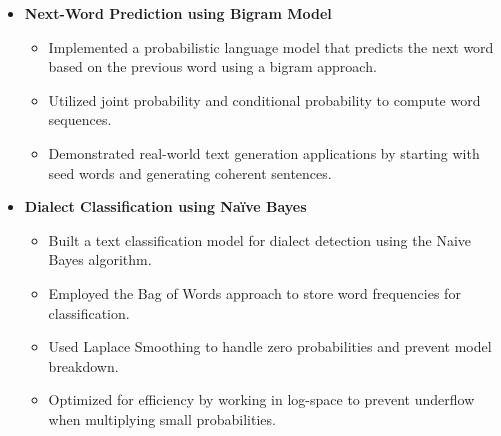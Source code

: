 \documentclass[letterpaper,11pt]{article}
\newcommand{\resitem}[1]{\item #1 \vspace{-2pt}}
\begin{document}
\begin{itemize}
\item[]
	\textbf{Next-Word Prediction using Bigram Model}
	\vspace{-3mm}
	\begin{itemize}
	    \resitem{Implemented a probabilistic language model that predicts the next word based on the previous word using a bigram approach.}
	    \resitem{Utilized joint probability and conditional probability to compute word sequences.}
	    \resitem{Demonstrated real-world text generation applications by starting with seed words and generating coherent sentences.}
	\end{itemize}

\item[]
	\textbf{Dialect Classification using Naïve Bayes}
	\vspace{-3mm}
	\begin{itemize}
	    \resitem{Built a text classification model for dialect detection using the Naive Bayes algorithm.}
	    \resitem{Employed the Bag of Words approach to store word frequencies for classification.}
	    \resitem{Used Laplace Smoothing to handle zero probabilities and prevent model breakdown.}
	    \resitem{Optimized for efficiency by working in log-space to prevent underflow when multiplying small probabilities.}
	\end{itemize}

\end{itemize}
\end{document}
